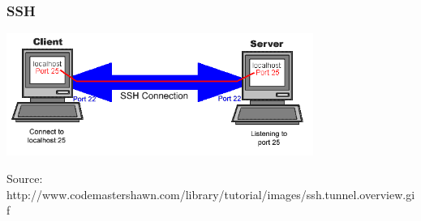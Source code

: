 
\begin{frame}
\frametitle{SSH}

\begin{center}
  \includegraphics[width=10cm]{figs/ssh-tunnel.png}
\end{center}


\begin{flushright}
{\tiny
Source: http://www.codemastershawn.com/library/tutorial/images/ssh.tunnel.overview.gif
}
\end{flushright}

\end{frame}



